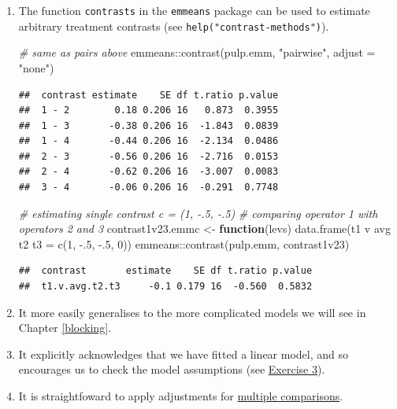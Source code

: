 \documentclass[
]{book}
\newenvironment{Shaded}{\begin{snugshade}}{\end{snugshade}}
\newcommand{\AttributeTok}[1]{\textcolor[rgb]{0.77,0.63,0.00}{#1}}
\newcommand{\CommentTok}[1]{\textcolor[rgb]{0.56,0.35,0.01}{\textit{#1}}}
\newcommand{\ControlFlowTok}[1]{\textcolor[rgb]{0.13,0.29,0.53}{\textbf{#1}}}
\newcommand{\DecValTok}[1]{\textcolor[rgb]{0.00,0.00,0.81}{#1}}
\newcommand{\FunctionTok}[1]{\textcolor[rgb]{0.00,0.00,0.00}{#1}}
\newcommand{\NormalTok}[1]{#1}
\newcommand{\OtherTok}[1]{\textcolor[rgb]{0.56,0.35,0.01}{#1}}
\newcommand{\SpecialCharTok}[1]{\textcolor[rgb]{0.00,0.00,0.00}{#1}}
\newcommand{\StringTok}[1]{\textcolor[rgb]{0.31,0.60,0.02}{#1}}
\theoremstyle{definition}
\theoremstyle{definition}
\theoremstyle{definition}
\theoremstyle{definition}
\theoremstyle{remark}
\begin{document}
\begin{enumerate}
\def\labelenumi{\alph{enumi}.}
\item
  The function \texttt{contrasts} in the \texttt{emmeans} package can be used to estimate arbitrary treatment contrasts (see \texttt{help("contrast-methods")}).

\begin{Shaded}
\begin{Highlighting}[]
\CommentTok{\# same as \textasciigrave{}pairs\textasciigrave{} above}
\NormalTok{emmeans}\SpecialCharTok{::}\FunctionTok{contrast}\NormalTok{(pulp.emm, }\StringTok{"pairwise"}\NormalTok{, }\AttributeTok{adjust =} \StringTok{"none"}\NormalTok{)}
\end{Highlighting}
\end{Shaded}

\begin{verbatim}
##  contrast estimate    SE df t.ratio p.value
##  1 - 2        0.18 0.206 16   0.873  0.3955
##  1 - 3       -0.38 0.206 16  -1.843  0.0839
##  1 - 4       -0.44 0.206 16  -2.134  0.0486
##  2 - 3       -0.56 0.206 16  -2.716  0.0153
##  2 - 4       -0.62 0.206 16  -3.007  0.0083
##  3 - 4       -0.06 0.206 16  -0.291  0.7748
\end{verbatim}

\begin{Shaded}
\begin{Highlighting}[]
\CommentTok{\# estimating single contrast c = (1, {-}.5, {-}.5)}
\CommentTok{\# comparing operator 1 with operators 2 and 3}
\NormalTok{contrast1v23.emmc }\OtherTok{\textless{}{-}} \ControlFlowTok{function}\NormalTok{(levs) }
  \FunctionTok{data.frame}\NormalTok{(}\StringTok{\textquotesingle{}t1 v avg t2 t3\textquotesingle{}} \OtherTok{=} \FunctionTok{c}\NormalTok{(}\DecValTok{1}\NormalTok{, }\SpecialCharTok{{-}}\NormalTok{.}\DecValTok{5}\NormalTok{, }\SpecialCharTok{{-}}\NormalTok{.}\DecValTok{5}\NormalTok{, }\DecValTok{0}\NormalTok{))}
\NormalTok{emmeans}\SpecialCharTok{::}\FunctionTok{contrast}\NormalTok{(pulp.emm, }\StringTok{\textquotesingle{}contrast1v23\textquotesingle{}}\NormalTok{)}
\end{Highlighting}
\end{Shaded}

\begin{verbatim}
##  contrast       estimate    SE df t.ratio p.value
##  t1.v.avg.t2.t3     -0.1 0.179 16  -0.560  0.5832
\end{verbatim}
\item
  It more easily generalises to the more complicated models we will see in Chapter \ref{blocking}.
\item
  It explicitly acknowledges that we have fitted a linear model, and so encourages us to check the model assumptions (see \protect\hyperlink{nap-black-ex}{Exercise 3}).
\item
  It is straightfoward to apply adjustments for \protect\hyperlink{multiple-comp}{multiple comparisons}.
\end{enumerate}
\end{document}
